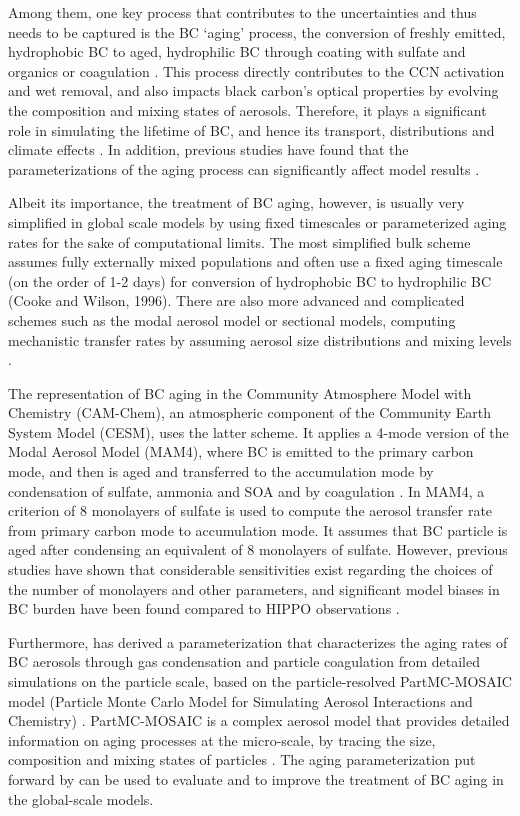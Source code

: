 \documentclass[12pt, fullpage]{uiucthesis2009}
\begin{document}
	Among them, one key process that contributes to the uncertainties and thus needs to be captured is the BC ‘aging’ process, the conversion of freshly emitted, hydrophobic BC to aged, hydrophilic BC through coating with sulfate and organics or coagulation \citep[][]{langner1992periodicity,parungo1994aeolian,liousse1996global}. This process directly contributes to the CCN activation and wet removal, and also impacts black carbon's optical properties by evolving the composition and mixing states of aerosols. Therefore, it plays a significant role in simulating the lifetime of BC, and hence its transport, distributions and climate effects \citep[e.g.][]{croft2005black,riemer2004soot}. In addition, previous studies have found that the parameterizations of the aging process can significantly affect model results \citep{Liu2010}.
	
	Albeit its importance, the treatment of BC aging, however, is usually very simplified in global scale models by using fixed timescales or parameterized aging rates for the sake of computational limits. The most simplified bulk scheme assumes fully externally mixed populations and often use a fixed aging timescale (on the order of 1-2 days) for conversion of hydrophobic BC to hydrophilic BC (Cooke and Wilson, 1996). There are also more advanced and complicated schemes such as the modal aerosol model or sectional models, computing mechanistic transfer rates by assuming aerosol size distributions and mixing levels \citep[e.g.][]{bauer2013historical,huang2013enrichment}. 
	
	The representation of BC aging in the Community Atmosphere Model with Chemistry (CAM-Chem), an atmospheric component of the Community Earth System Model (CESM), uses the latter scheme. It applies a 4-mode version of the Modal Aerosol Model (MAM4), where BC is emitted to the primary carbon mode, and then is aged and transferred to the accumulation mode by condensation of sulfate, ammonia and SOA and by coagulation \citep[e.g.][]{Liu2012,Lamarque2012}. In MAM4, a criterion of 8 monolayers of sulfate is used to compute the aerosol transfer rate from primary carbon mode to accumulation mode. It assumes that BC particle is aged after condensing an equivalent of 8 monolayers of sulfate. However, previous studies have shown that considerable sensitivities exist regarding the choices of the number of monolayers and other parameters, and significant model biases in BC burden have been found compared to HIPPO observations \citep{Liu2010}. 
	
	Furthermore, \citet{Fierce2016} has derived a parameterization that characterizes the aging rates of BC aerosols through gas condensation and particle coagulation from detailed simulations on the particle scale, based on the particle-resolved PartMC-MOSAIC model (Particle Monte Carlo Model for Simulating Aerosol Interactions and Chemistry) \citep{Fierce2016}. PartMC-MOSAIC is a complex aerosol model that provides detailed information on aging processes at the micro-scale, by tracing the size, composition and mixing states of particles \citep{riemer2010introducing}. The aging parameterization put forward by \citet{Fierce2016} can be used to evaluate and to improve the treatment of BC aging in the global-scale models. 
	
\end{document}
